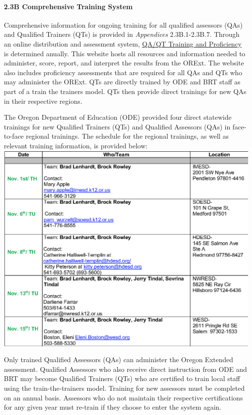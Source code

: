 \documentclass[]{article}
\let\oldparagraph\paragraph
\renewcommand{\paragraph}[1]{\oldparagraph{#1}\mbox{}}
\begin{document}
\hypertarget{b-comprehensive-training-system}{%
\paragraph{2.3B Comprehensive Training
System}\label{b-comprehensive-training-system}}

Comprehensive information for ongoing training for all qualified
assessors (QAs) and Qualified Trainers (QTs) is provided in
\emph{Appendices} 2.3B.1-2.3B.7. Through an online distribution and
assessment system, \color{link}\href{https://or.k12test.com/}{QA/QT
Training and Proficiency} \color{black} is determined anually. This
website hosts all resources and information needed to administer, score,
report, and interpret the results from the ORExt. The website also
includes proficiency assessments that are required for all QAs and QTs
who may administer the ORExt. QTs are directly trained by ODE and BRT
staff as part of a train the trainers model. QTs then provide direct
trainings for new QAs in their respective regions.

The Oregon Department of Education (ODE) provided four direct statewide
trainings for new Qualified Trainers (QTs) and Qualified Assessors (QAs)
in face-to-face regional trainings. The schedule for the regional
trainings, as well as relevant training information, is provided below:
\FloatBarrier
\includegraphics{Figures/TrainingSched/2018_19_TrainingSchedule.png}

Only trained Qualified Assessors (QAs) can administer the Oregon
Extended assessment. Qualified Assessors who also receive direct
instruction from ODE and BRT may become Qualified Trainers (QTs) who are
certified to train local staff using the train-the-trainers model.
Training for new assessors must be completed on an annual basis.
Assessors who do not maintain their respective certifications for any
given year must re-train if they choose to enter the system again.
\end{document}
